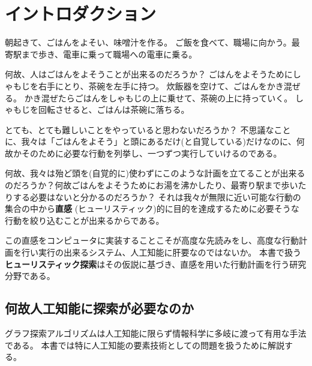 \chapter{イントロダクション}
\label{ch:introduction}

朝起きて、ごはんをよそい、味噌汁を作る。
ご飯を食べて、職場に向かう。最寄駅まで歩き、電車に乗って職場への電車に乗る。

何故、人はごはんをよそうことが出来るのだろうか？
ごはんをよそうためにしゃもじを右手にとり、茶碗を左手に持つ。
炊飯器を空けて、ごはんをかき混ぜる。
かき混ぜたらごはんをしゃもじの上に乗せて、茶碗の上に持っていく。
しゃもじを回転させると、ごはんは茶碗に落ちる。

とても、とても難しいことをやっていると思わないだろうか？
不思議なことに、我々は「ごはんをよそう」と頭にあるだけ(と自覚している)だけなのに、何故かそのために必要な行動を列挙し、一つずつ実行していけるのである。

何故、我々は殆ど頭を(自覚的に)使わずにこのような計画を立てることが出来るのだろうか？何故ごはんをよそうためにお湯を沸かしたり、最寄り駅まで歩いたりする必要はないと分かるのだろうか？
それは我々が無限に近い可能な行動の集合の中から{\bf 直感} (ヒューリスティック)的に目的を達成するために必要そうな行動を絞り込むことが出来るからである。

この直感をコンピュータに実装することこそが高度な先読みをし、高度な行動計画を行い実行の出来るシステム、人工知能に肝要なのではないか。
本書で扱う{\bf ヒューリスティック探索}はその仮説に基づき、直感を用いた行動計画を行う研究分野である。




\section{何故人工知能に探索が必要なのか}
\label{sec:why-search}

グラフ探索アルゴリズムは人工知能に限らず情報科学に多岐に渡って有用な手法である。
本書では特に人工知能の要素技術としての問題を扱うために解説する。

